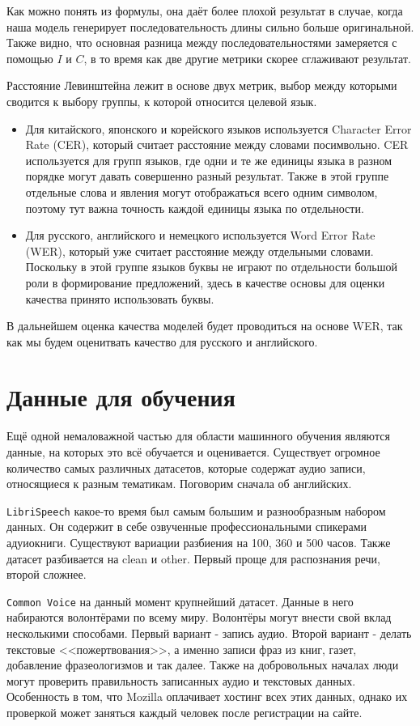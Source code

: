 Как можно понять из формулы, она даёт более плохой результат в случае, когда наша модель генерирует последовательность длины сильно больше оригинальной.
Также видно, что основная разница между последовательностями замеряется с помощью $I$ и $C$, в то время как две другие метрики скорее сглаживают результат.

Расстояние Левинштейна лежит в основе двух метрик, выбор между которыми сводится к выбору группы, к которой относится целевой язык.
\begin{itemize}
  \item Для китайского, японского и корейского языков используется Character Error Rate (CER), который считает расстояние между словами посимвольно.
  CER используется для групп языков, где одни и те же единицы языка в разном порядке могут давать совершенно разный результат.
  Также в этой группе отдельные слова и явления могут отображаться всего одним символом, поэтому тут важна точность каждой единицы языка по отдельности.
  \item Для русского, английского и немецкого используется Word Error Rate (WER), который уже считает расстояние между отдельными словами.
  Поскольку в этой группе языков буквы не играют по отдельности большой роли в формирование предложений, здесь в качестве основы для оценки качества принято использовать буквы.
\end{itemize}

В дальнейшем оценка качества моделей будет проводиться на основе WER, так как мы будем оценитвать качество для русского и английского.

\section{Данные для обучения}

Ещё одной немаловажной частью для области машинного обучения являются данные, на которых это всё обучается и оценивается.
Существует огромное количество самых различных датасетов, которые содержат аудио записи, относящиеся  к разным тематикам.
Поговорим сначала об английских.

\texttt{LibriSpeech} какое-то время был самым большим и разнообразным набором данных.
Он содержит в себе озвученные профессиональными спикерами адуиокниги.
Существуют вариации разбиения на 100, 360 и 500 часов.
Также датасет разбивается на clean и other.
Первый проще для распознания речи, второй сложнее.

\texttt{Common Voice} на данный момент крупнейший датасет.
Данные в него набираются волонтёрами по всему миру.
Волонтёры могут внести свой вклад несколькими способами.
Первый вариант - запись аудио.
Второй вариант - делать текстовые <<пожертвования>>, а именно записи фраз из книг, газет, добавление фразеологизмов и так далее.
Также на добровольных началах люди могут проверить правильность записанных аудио и текстовых данных.
Особенность в том, что Mozilla оплачивает хостинг всех этих данных, однако их проверкой может заняться каждый человек после регистрации на сайте.

